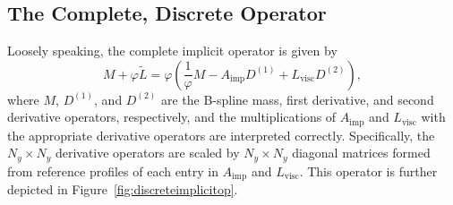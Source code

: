 \subsection{The Complete, Discrete Operator}
\label{sec:complete_implicit_operator}
Loosely speaking, the complete implicit operator is given by
%
\begin{equation*}
M + \varphi \tilde{L} = \varphi \left( \frac{1}{\varphi} M - A_{\mathrm{imp}} D^{(1)} + L_{\mathrm{visc}} D^{(2)} \right),
\end{equation*}
% 
where $M$, $D^{(1)}$, and $D^{(2)}$ are the B-spline mass, first
derivative, and second derivative operators, respectively, and the
multiplications of $A_{\mathrm{imp}}$ and $L_{\mathrm{visc}}$ with the
appropriate derivative operators are interpreted correctly.
Specifically, the $N_y \times N_y$ derivative operators are scaled by
$N_y \times N_y$ diagonal matrices formed from reference profiles of
each entry in $A_{\mathrm{imp}}$ and $L_{\mathrm{visc}}$.  This
operator is further depicted in Figure~\ref{fig:discreteimplicitop}.


